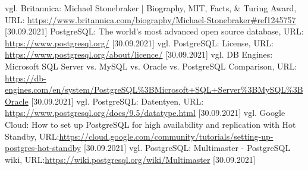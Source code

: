 \begin{thebibliography}{2}
         vgl. Britannica: Michael Stonebraker | Biography, MIT, Facts, \& Turing Award, URL: \url{https://www.britannica.com/biography/Michael-Stonebraker#ref1245757} [30.09.2021]
         PostgreSQL: The world's most advanced open source database, URL: \url{https://www.postgresql.org/} [30.09.2021]
         vgl. PostgreSQL: License, URL: \url{https://www.postgresql.org/about/licence/} [30.09.2021]
         vgl. DB Engines: Microsoft SQL Server vs. MySQL vs. Oracle vs. PostgreSQL Comparison, URL: \url{https://db-engines.com/en/system/PostgreSQL%3BMicrosoft+SQL+Server%3BMySQL%3BOracle} [30.09.2021]
         vgl. PostgreSQL: Datentyen, URL: \url{https://www.postgresql.org/docs/9.5/datatype.html} [30.09.2021]
         vgl. Google Cloud: How to set up PostgreSQL for high availability and replication with Hot Standby, URL:\url{https://cloud.google.com/community/tutorials/setting-up-postgres-hot-standby} [30.09.2021]
         vgl. PostgreSQL: Multimaster - PostgreSQL wiki, URL:\url{https://wiki.postgresql.org/wiki/Multimaster} [30.09.2021]


\end{thebibliography}
